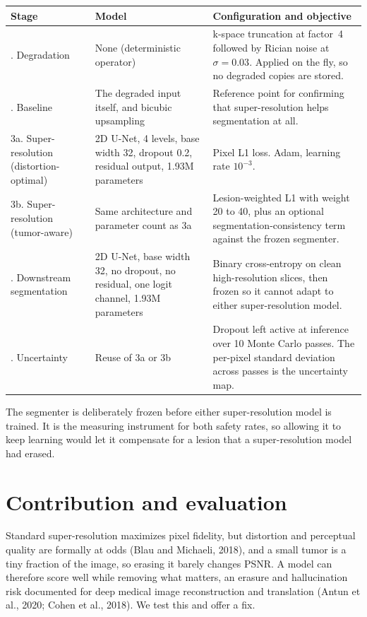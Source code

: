 \documentclass[11pt,a4paper]{article}
\begin{document}
\begin{center}\small
\renewcommand{\arraystretch}{1.2}
\begin{tabular}{@{}>{\raggedright\arraybackslash}p{2.9cm}>{\raggedright\arraybackslash}p{5.4cm}>{\raggedright\arraybackslash}p{7.0cm}@{}}
\toprule
\textbf{Stage} & \textbf{Model} & \textbf{Configuration and objective} \\
\midrule
1. Degradation & None (deterministic operator) & k-space truncation at factor~4 followed by Rician noise at $\sigma = 0.03$. Applied on the fly, so no degraded copies are stored. \\
2. Baseline & The degraded input itself, and bicubic upsampling & Reference point for confirming that super-resolution helps segmentation at all. \\
3a. Super-resolution (distortion-optimal) & 2D U-Net, 4 levels, base width 32, dropout 0.2, residual output, 1.93M parameters & Pixel L1 loss. Adam, learning rate $10^{-3}$. \\
3b. Super-resolution (tumor-aware) & Same architecture and parameter count as 3a & Lesion-weighted L1 with weight 20 to 40, plus an optional segmentation-consistency term against the frozen segmenter. \\
4. Downstream segmentation & 2D U-Net, base width 32, no dropout, no residual, one logit channel, 1.93M parameters & Binary cross-entropy on clean high-resolution slices, then frozen so it cannot adapt to either super-resolution model. \\
5. Uncertainty & Reuse of 3a or 3b & Dropout left active at inference over 10 Monte Carlo passes. The per-pixel standard deviation across passes is the uncertainty map. \\
\bottomrule
\end{tabular}
\end{center}

The segmenter is deliberately frozen before either super-resolution model is trained. It is the measuring instrument for both safety rates, so allowing it to keep learning would let it compensate for a lesion that a super-resolution model had erased.

\section*{Contribution and evaluation}

Standard super-resolution maximizes pixel fidelity, but distortion and perceptual quality are formally at odds (Blau and Michaeli, 2018), and a small tumor is a tiny fraction of the image, so erasing it barely changes PSNR. A model can therefore score well while removing what matters, an erasure and hallucination risk documented for deep medical image reconstruction and translation (Antun et al., 2020; Cohen et al., 2018). We test this and offer a fix.
\end{document}
